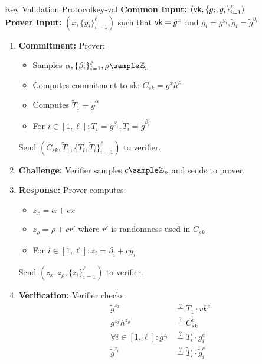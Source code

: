 \begin{protocol}{Key Validation Protocol}{key-val}
\textbf{Common Input:} $(\mathsf{vk}, \{g_i, \tilde{g}_i\}_{i=1}^\ell)$\\
\textbf{Prover Input:} $(x, \{y_i\}_{i=1}^\ell)$ such that $\mathsf{vk} = \tilde{g}^x$ and $g_i = g^{y_i}, \tilde{g}_i = \tilde{g}^{y_i}$
\begin{enumerate}
    \item \textbf{Commitment:} Prover:
    \begin{itemize}
        \item Samples $\alpha, \{\beta_i\}_{i=1}^\ell, \rho \sample \Z_p$
        \item Computes commitment to sk: $C_{sk} = g^x h^\rho$
        \item Computes $\tilde{T}_1 = \tilde{g}^\alpha$
        \item For $i \in [1,\ell]: T_i = g^{\beta_i}, \tilde{T}_i = \tilde{g}^{\beta_i}$
    \end{itemize}
    Send $(C_{sk}, \tilde{T}_1, \{T_i, \tilde{T}_i\}_{i=1}^\ell)$ to verifier.
    
    \item \textbf{Challenge:} Verifier samples $c \sample \Z_p$ and sends to prover.
    
    \item \textbf{Response:} Prover computes:
    \begin{itemize}
        \item $z_x = \alpha + cx$
        \item $z_\rho = \rho + cr'$ where $r'$ is randomness used in $C_{sk}$
        \item For $i \in [1,\ell]: z_i = \beta_i + cy_i$
    \end{itemize}
    Send $(z_x, z_\rho, \{z_i\}_{i=1}^\ell)$ to verifier.
    
    \item \textbf{Verification:} Verifier checks:
    \begin{align*}
        \tilde{g}^{z_x} &\stackrel{?}{=} \tilde{T}_1 \cdot vk^c\\
        g^{z_x}h^{z_\rho} &\stackrel{?}{=} C_{sk}^c\\
        \forall i \in [1,\ell]: g^{z_i} &\stackrel{?}{=} T_i \cdot g_i^c\\
        \tilde{g}^{z_i} &\stackrel{?}{=} \tilde{T}_i \cdot \tilde{g}_i^c
    \end{align*}
\end{enumerate}
\end{protocol}





